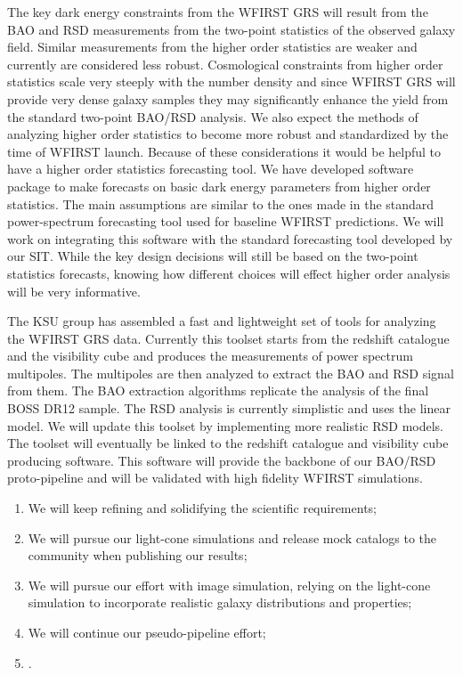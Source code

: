  The key dark energy constraints from the WFIRST GRS will result from the BAO and
 RSD measurements from the two-point statistics of the observed galaxy field.
 Similar measurements from the higher order statistics are weaker and currently
 are considered less robust. Cosmological constraints from higher order
 statistics scale very steeply with the number density and since WFIRST GRS will
 provide very dense galaxy samples they may significantly enhance the yield from
 the standard two-point BAO/RSD analysis. We also expect the methods of analyzing
 higher order statistics to become more robust and standardized by the time of
 WFIRST launch. Because of these considerations it would be helpful to have a
 higher order statistics forecasting tool. We have developed software package to
 make forecasts on basic dark energy parameters from higher order statistics.
 The main assumptions are similar to the ones made in the standard
 power-spectrum forecasting tool used for baseline WFIRST predictions. We will
 work on integrating this software with the standard forecasting tool developed
 by our SIT. While the key design decisions will still be based on the
 two-point statistics forecasts, knowing how different choices will effect higher
 order analysis will be very informative.

 The KSU group has assembled a fast and lightweight set of tools for analyzing
 the WFIRST GRS data. Currently this toolset starts from the redshift catalogue
 and the visibility cube and produces the measurements of power spectrum
 multipoles. The multipoles are then analyzed to extract the BAO and RSD signal
 from them. The BAO extraction algorithms replicate the analysis of the final
 BOSS DR12 sample. The RSD analysis is currently simplistic and uses the linear
 model. We will update this toolset by implementing more realistic RSD models.
 The toolset will eventually be linked to the redshift catalogue and visibility
 cube producing software. This software will provide the backbone of our BAO/RSD
 proto-pipeline and will be validated with high fidelity WFIRST simulations.


 \begin{summary}
 \begin{enumerate}
 \item We will keep refining and solidifying the scientific requirements;
 \item We will pursue our light-cone simulations and release mock catalogs to the community when publishing our results;
 \item We will pursue our effort with image simulation, relying on the light-cone simulation to incorporate realistic galaxy distributions and properties;
 \item We will continue our pseudo-pipeline effort;
 \item {}.
 \end{enumerate}
 \end{summary}
